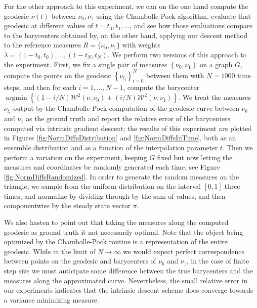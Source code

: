 \documentclass{article}
\DeclareMathOperator*{\argmin}{argmin}
\newcommand{\W}{\mathcal{W}}
\begin{document}
For the other approach to this experiment, we can on the one hand compute the geodesic \(\nu(t)\) between \(\nu_0, \nu_1\) using the Chambolle-Pock algorithm, evaluate that geodesic at different values of \(t = t_0, t_1, \dots\), and see how those evaluations compare to the barycenters obtained by, on the other hand, applying our descent method to the reference measures \(R = \{\nu_0, \nu_1\}\) with weights \(\lambda = (1 - t_0, t_0),  \dots, (1 - t_N, t_N)\). We perform two versions of this approach to the experiment. First, we fix a single pair of measures \(\left\{ \nu_0, \nu_1 \right\}\) on a graph \(G\), compute the points on the geodesic \(\left\{ \nu_{t_i} \right\}_{i=0}^{N}\) between them with \(N=1000\) time steps, and then for each \(i=1, \dots, N - 1\), compute the barycenter \(\argmin\left\{ (1 - i/N)\W^2(\nu,\nu_0) + (i/N)\W^2(\nu,\nu_1) \right\}\). We treat the measures \(\nu_{t_i}\) output by the Chambolle-Pock computation of the geodesic curve between \(\nu_0\) and \(\nu_1\) as the ground truth and report the relative error of the barycenters computed via intrinsic gradient descent; the results of this experiment are plotted in Figures \ref{fig:NormDiffsDistribution} and \ref{fig:NormDiffsInTime}, both as an ensemble distribution and as a function of the interpolation parameter \(t\). Then we perform a variation on the experiment, keeping \(G\) fixed but now letting the measures and coordinates be randomly generated each time, see Figure \ref{fig:NormDiffsRandomized}. In order to generate the random measures on the triangle, we sample from the uniform distribution on the interval \([0,1]\) three times, and normalize by dividing through by the sum of values, and then componentwise by the steady state vector \(\pi\).

We also hasten to point out that taking the measures along the computed geodesic as ground truth it not necessarily optimal. Note that the object being optimized by the Chambolle-Pock routine is a representation of the entire geodesic. While in the limit of \(N \to \infty\) we would expect perfect correspondence between points on the geodesic and barycenters of \(\nu_0\) and \(\nu_1\), in the case of finite step size we must anticipate some difference between the true barycenters and the measures along the approximated curve. Nevertheless, the small relative error in our experiments indicates that the intrinsic descent scheme does converge towards a variance minimizing measure.
\end{document}
